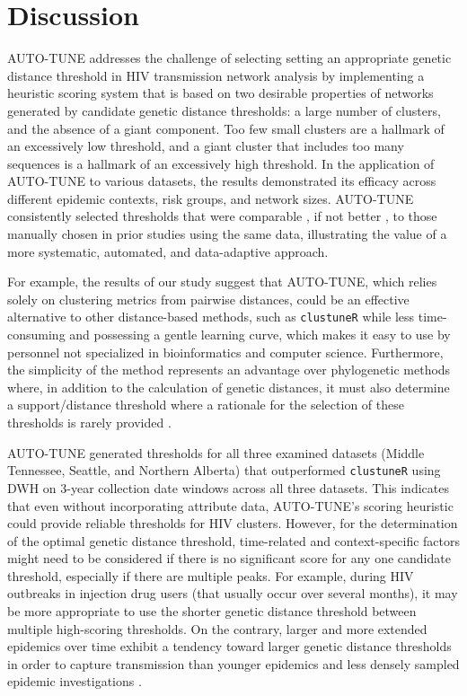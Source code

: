 \documentclass[utf8]{FrontiersinHarvard} %
\newcommand{\TODO}[1]{{\color{red}{#1}}}
\begin{document}

\section{Discussion}

AUTO-TUNE addresses the challenge of selecting setting an appropriate genetic
distance threshold in HIV transmission network analysis by implementing a
heuristic scoring system that is based on two desirable properties of networks
generated by candidate genetic distance thresholds: a large number of clusters,
and the absence of a giant component. Too few small clusters are a hallmark of
an excessively low threshold, and a giant cluster that includes too many
sequences is a hallmark of an excessively high threshold. In the application of
AUTO-TUNE to various datasets, the results demonstrated its efficacy across
different epidemic contexts, risk groups, and network sizes. \TODO{Not sure
	what efficacy means} AUTO-TUNE consistently selected thresholds that were
comparable \TODO{comparable how?}, if not better \TODO{better how?}, to those
manually chosen in prior studies using the same data, illustrating the value of
a more systematic, automated, and data-adaptive approach.

For example, the results of our study suggest that AUTO-TUNE, which relies
solely on clustering metrics from pairwise distances, could be an effective
alternative to other distance-based methods, such as {\tt clustuneR} while less
time-consuming and possessing a gentle learning curve, which makes it easy to
use by personnel not specialized in bioinformatics and computer science.
Furthermore, the simplicity of the method represents an advantage over
phylogenetic methods where, in addition to the calculation of genetic
distances, it must also determine a support/distance threshold where a
rationale for the selection of these thresholds is rarely provided
\citep{junqueira_factors_2019}.

AUTO-TUNE generated thresholds for all three examined datasets (Middle
Tennessee, Seattle, and Northern Alberta) that outperformed {\tt clustuneR}
using DWH on 3-year collection date windows across all three datasets. This
indicates that even without incorporating attribute data, AUTO-TUNE's scoring
heuristic could provide reliable thresholds for HIV clusters. However, for the
determination of the optimal genetic distance threshold, time-related and
context-specific factors might need to be considered if there is no significant
score for any one candidate threshold, especially if there are multiple peaks.
For example, during HIV outbreaks in injection drug users (that usually occur
over several months), it may be more appropriate to use the shorter genetic
distance threshold \citep{peters_hiv_2016,campbell_detailed_2017} between
multiple high-scoring thresholds. On the contrary, larger and more extended
epidemics over time exhibit a tendency toward larger genetic distance
thresholds in order to capture transmission than younger epidemics and less
densely sampled epidemic investigations
\citep{patil_exploring_2022,leung_molecular_2019,di_giallonardo_subtype-specific_2021}.
\end{document}
